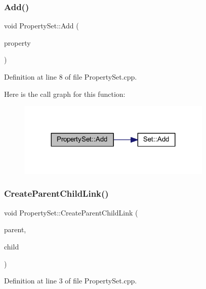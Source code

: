 \subsubsection{\texorpdfstring{Add()}{Add()}}
{\footnotesize\ttfamily void Property\+Set\+::\+Add (\begin{DoxyParamCaption}\item[{wx\+P\+G\+Property $\ast$}]{property }\end{DoxyParamCaption})}



Definition at line 8 of file Property\+Set.\+cpp.

Here is the call graph for this function\+:
\nopagebreak
\begin{figure}[H]
\begin{center}
\leavevmode
\includegraphics[width=263pt]{class_property_set_ae3ee2ada7aa02653e9f4da3e34640a1e_cgraph}
\end{center}
\end{figure}
\mbox{\label{class_property_set_a26e9efb314e2ed720719e13c459f137b}} 
\subsubsection{\texorpdfstring{Create\+Parent\+Child\+Link()}{CreateParentChildLink()}}
{\footnotesize\ttfamily void Property\+Set\+::\+Create\+Parent\+Child\+Link (\begin{DoxyParamCaption}\item[{wx\+P\+G\+Property $\ast$}]{parent,  }\item[{wx\+P\+G\+Property $\ast$}]{child }\end{DoxyParamCaption})}



Definition at line 3 of file Property\+Set.\+cpp.

\mbox{\label{class_property_set_a158da716546ca640cd81ffb555bcfddc}} 
